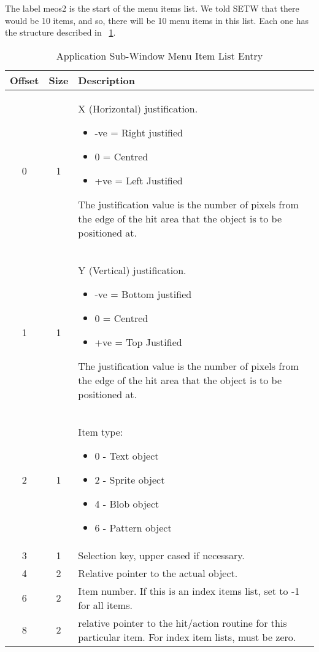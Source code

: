 The label meos2 is the start of the menu items list. We told SETW
    that there would be 10 items, and so, there will be 10 menu items in this
    list. Each one has the structure described in \tablename~\ref{tab:ApplicationSubWindowMenuItemListEntry}.

\begin{table}[htbp]
\centering
\begin{tabular}{c c p{}}
\toprule
\textbf{Offset} & \textbf{Size} &\textbf{Description}  \\
\midrule
%
0 & 1 & X (Horizontal) justification.
\begin{itemize}[itemsep=0pt]
\item{} -ve = Right justified
\item{}0 = Centred
\item{}+ve = Left Justified
\end{itemize}
The justification value is the number of pixels from the edge of the hit area that the object is
to be positioned at.\\

1 & 1 & Y (Vertical) justification.
\begin{itemize}[itemsep=0pt]
\item{}-ve = Bottom justified
\item{}0 = Centred
\item{}+ve = Top Justified
\end{itemize}
The justification value is the number of pixels from the edge of the hit area that the object is
to be positioned at.\\

2 & 1 & Item type:
\begin{itemize}[itemsep=0pt]
\item{}0 - Text object
\item{}2 - Sprite object
\item{}4 - Blob object
\item{}6 - Pattern object
\end{itemize}
\\

3 & 1 & Selection key, upper cased if necessary.\\

4 & 2 & Relative pointer to the actual object.\\

6 & 2 & Item number. If this is an index items list, set to -1 for all items.\\

8 & 2 & relative pointer to the hit/action routine for this particular item. For index item lists, must be zero.\\
%
\bottomrule
\end{tabular}
\caption{Application Sub-Window Menu Item List Entry}
\label{tab:ApplicationSubWindowMenuItemListEntry}
\end{table}

